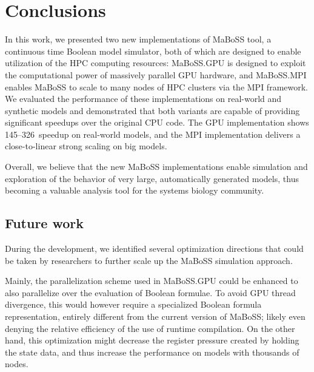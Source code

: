 \documentclass[sn-mathphys-num]{sn-jnl}%
\begin{document}


\section{Conclusions}

In this work, we presented two new implementations of MaBoSS tool, a continuous time Boolean model simulator, both of which are designed to enable utilization of the HPC computing resources: MaBoSS.GPU is designed to exploit the computational power of massively parallel GPU hardware, and MaBoSS.MPI enables MaBoSS to scale to many nodes of HPC clusters via the MPI framework. We evaluated the performance of these implementations on real-world and synthetic models and demonstrated that both variants are capable of providing significant speedups over the original CPU code. The GPU implementation shows 145--326\texttimes\ speedup on real-world models, and the MPI implementation delivers a close-to-linear strong scaling on big models.

Overall, we believe that the new MaBoSS implementations enable simulation and exploration of the behavior of very large, automatically generated models, thus becoming a valuable analysis tool for the systems biology community.

\subsection{Future work} 

During the development, we identified several optimization directions that could be taken by researchers to further scale up the MaBoSS simulation approach.

Mainly, the parallelization scheme used in MaBoSS.GPU could be enhanced to also parallelize over the evaluation of Boolean formulae. To avoid GPU thread divergence, this would however require a specialized Boolean formula representation, entirely different from the current version of MaBoSS; likely even denying the relative efficiency of the use of runtime compilation. On the other hand, this optimization might decrease the register pressure created by holding the state data, and thus increase the performance on models with thousands of nodes.
\end{document}
